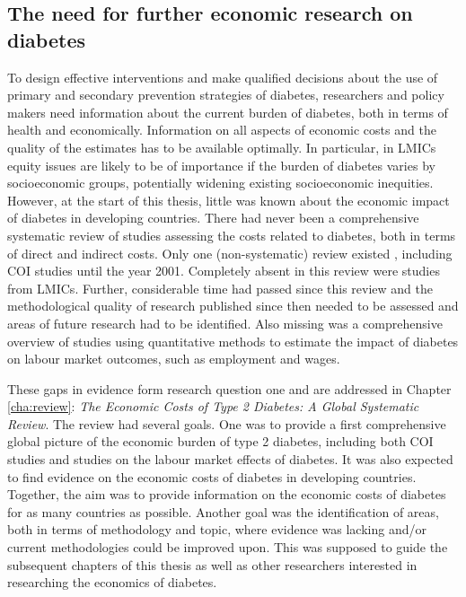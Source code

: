 \subsection{The need for further economic research on diabetes}

To design effective interventions and make qualified decisions about the use of primary and secondary prevention strategies of diabetes, researchers and policy makers need information about the current burden of diabetes, both in terms of health and economically. Information on all aspects of economic costs and the quality of the estimates has to be available optimally. In particular, in \acp{LMIC} equity issues are likely to be of importance if the burden of diabetes varies by socioeconomic groups, potentially widening existing socioeconomic inequities. However, at the start of this thesis, little was known about the economic impact of diabetes in developing countries. There had never been a comprehensive systematic review of studies assessing the costs related to diabetes, both in terms of direct and indirect costs. Only one (non-systematic) review existed \parencite{Ettaro2004}, including \ac{COI} studies  until the year 2001. Completely absent in this review were studies from \acp{LMIC}. Further, considerable time had passed since this review and the methodological quality of research published since then needed to be assessed and areas of future research had to be identified. Also missing was a comprehensive overview of studies using quantitative methods to estimate the impact of diabetes on labour market outcomes, such as employment and wages.

These gaps in evidence form research question one and are addressed in Chapter \ref{cha:review}: \textit{The Economic Costs of Type 2 Diabetes: A Global Systematic Review}. The review had several goals. One was to provide a first comprehensive global picture of the economic burden of type 2 diabetes, including both \ac{COI} studies and studies on the labour market effects of diabetes. It was also expected to find evidence on the economic costs of diabetes in developing countries. Together, the aim was to provide information on the economic costs of diabetes for as many countries as possible. Another goal was the identification of areas, both in terms of methodology and topic, where evidence was lacking and/or current methodologies could be improved upon. This was supposed to guide the subsequent chapters of this thesis as well as other researchers interested in researching the economics of diabetes.

